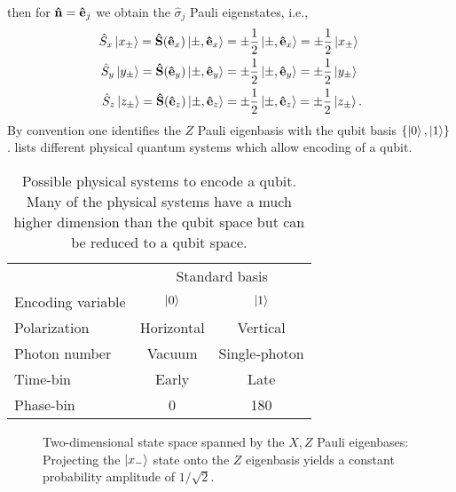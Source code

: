 then for $\vu{n}=\vu{e}_j$ we obtain the $\hat{\sigma}_j$ Pauli eigenstates, i.e.,
\begin{align}
	\hat{S}_x
	\ket{x_\pm}
	=	
	\vb{\hat{S}}(\vu{e}_x)
	\ket{\pm,\vu{e}_x}
	&=
	\pm\frac{1}{2}
	\ket{\pm,\vu{e}_x}
	=
	\pm\frac{1}{2}
	\ket{x_\pm}
	\\
	\hat{S}_y
	\ket{y_\pm}
	=	
	\vb{\hat{S}}(\vu{e}_y)
	\ket{\pm,\vu{e}_y}
	&=
	\pm\frac{1}{2}
	\ket{\pm,\vu{e}_y}
	=
	\pm\frac{1}{2}
	\ket{y_\pm}
	\\
	\hat{S}_z
	\ket{z_\pm}
	=	
	\vb{\hat{S}}(\vu{e}_z)
	\ket{\pm,\vu{e}_z}
	&=
	\pm\frac{1}{2}
	\ket{\pm,\vu{e}_z}
	=
	\pm\frac{1}{2}
	\ket{z_\pm}
	.
\end{align}
By convention one identifies the $Z$ Pauli eigenbasis with the qubit basis $\left\{\ket{0},\ket{1}\right\}$.
 lists different physical quantum systems  which allow encoding of a qubit.
\begin{table}[htb]
	\centering	
	\begin{tabular}{lcc}
		\toprule
		& \multicolumn{2}{c}{Standard basis} \\
		\cmidrule{2-3}
		Encoding variable & $\ket{0}$ & $\ket{1}$ \\
		\midrule
		Polarization & Horizontal & Vertical \\
		Photon number & Vacuum & Single-photon \\
		Time-bin & Early & Late \\
		Phase-bin & \SI{0}{\deg} & \SI{180}{\deg} \\
		\bottomrule
	\end{tabular}
	\caption{Possible physical systems to encode a qubit. Many of the physical systems have a much higher dimension than the qubit space but can be reduced to a qubit space.}\label{tab:qubit_encodings}
\end{table}
\begin{figure}[htb]
	\centering
	
	\caption{Two-dimensional state space spanned by the $X,Z$ Pauli eigenbases: Projecting the $\ket{x_-}$ state onto the $Z$ eigenbasis yields a constant probability amplitude of $1/\sqrt{2}$.}
\end{figure}

